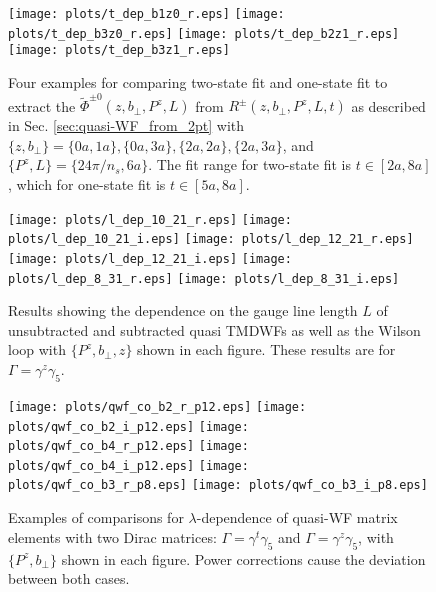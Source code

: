 \documentclass[prd,aps,twocolumn,preprintnumbers, showpacs, nofootinbib,superscriptaddress,notitlepage]{revtex4-1}
\begin{document}
\newpage
\begin{widetext}


\begin{figure}
    \centering
    \texttt{[image: plots/t\_dep\_b1z0\_r.eps]}
    \texttt{[image: plots/t\_dep\_b3z0\_r.eps]}
    \texttt{[image: plots/t\_dep\_b2z1\_r.eps]}
    \texttt{[image: plots/t\_dep\_b3z1\_r.eps]}
    \caption{Four examples for comparing two-state fit and one-state fit to extract the $\tilde{\Phi}^{\pm0}(z,b_{\perp},P^z,L)$ from $R^{\pm}(z,b_{\perp},P^z,L,t)$ as described in Sec. \ref{sec:quasi-WF_from_2pt} with $\{z,b_{\perp}\}=\{0a,1a\},\{0a,3a\},\{2a,2a\},\{2a,3a\}$, and $\{P^z,L\}=\{24\pi/n_s,6a\}$. The fit range for two-state fit is $t\in[2a,8a]$, which for one-state fit is $t\in[5a,8a]$.}
    \label{fig:t_dep}
\end{figure}


\begin{figure}
    \centering
    \texttt{[image: plots/l\_dep\_10\_21\_r.eps]}
    \texttt{[image: plots/l\_dep\_10\_21\_i.eps]}
    \texttt{[image: plots/l\_dep\_12\_21\_r.eps]}
    \texttt{[image: plots/l\_dep\_12\_21\_i.eps]}
    \texttt{[image: plots/l\_dep\_8\_31\_r.eps]}
    \texttt{[image: plots/l\_dep\_8\_31\_i.eps]}
    \caption{Results showing the dependence  on the gauge line length $L$ of unsubtracted and subtracted quasi TMDWFs as well as the Wilson loop with $\{P^z,b_{\perp},z\}$ shown in each figure. These results are for  $\Gamma=\gamma^z\gamma_5$.}
    \label{fig:multi_l_dep}
\end{figure}

\begin{figure}
    \centering
    \texttt{[image: plots/qwf\_co\_b2\_r\_p12.eps]}
    \texttt{[image: plots/qwf\_co\_b2\_i\_p12.eps]}
    \texttt{[image: plots/qwf\_co\_b4\_r\_p12.eps]}
    \texttt{[image: plots/qwf\_co\_b4\_i\_p12.eps]}
    \texttt{[image: plots/qwf\_co\_b3\_r\_p8.eps]}
    \texttt{[image: plots/qwf\_co\_b3\_i\_p8.eps]}
    \caption{Examples of comparisons for $\lambda$-dependence of quasi-WF matrix elements with two Dirac matrices: $\Gamma=\gamma^t\gamma_5$ and $\Gamma=\gamma^z\gamma_5$, with $\{P^z,b_{\perp}\}$ shown in each figure. Power corrections cause the deviation between both cases.}
    \label{fig:multi_qwf_co}
\end{figure}


\end{widetext}




 
 
\end{document}
